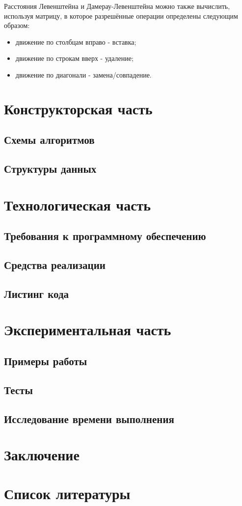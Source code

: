﻿\documentclass[12pt]{report}
\begin{document}
	Расстояния Левенштейна и Дамерау-Левенштейна можно также вычислить, используя матрицу, в которое разрешённые операции определены следующим образом:
	\begin{itemize}
		\item движение по столбцам вправо - вставка;
		\item движение по строкам вверх - удаление;
		\item движение по диагонали - замена/совпадение.
	\end{itemize}

	\chapter{Конструкторская часть}

	\section{Схемы алгоритмов}

	\section{Структуры данных}
	
	\chapter{Технологическая часть}
	\section{Требования к программному обеспечению}
	\section{Средства реализации}
   \section{Листинг кода}

	\chapter{Экспериментальная часть}
	\section{Примеры работы}
	\section{Тесты}
   \section{Исследование времени выполнения}

   \chapter*{Заключение}

	\chapter*{Список литературы}
\end{document}
